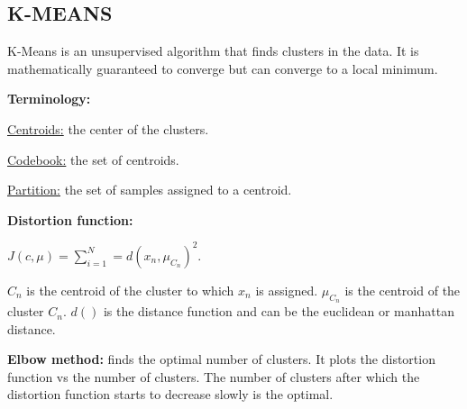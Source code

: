 \subsection*{K-MEANS}
K-Means is an unsupervised algorithm that finds clusters in the data. It is mathematically
guaranteed to converge but can converge to a local minimum.

\textbf{Terminology:}

\underline{Centroids:} the center of the clusters.

\underline{Codebook:} the set of centroids.

\underline{Partition:} the set of samples assigned to a centroid.

\textbf{Distortion function:}

$J(c, \mu)=\sum_{i=1}^{N} = d(x_n, \mu_{C_n})^2$.

$C_n$ is the centroid of the cluster to which $x_n$ is assigned.
$\mu_{C_n}$ is the centroid of the cluster $C_n$. $d()$ is the distance function and can
be the euclidean or manhattan distance.

\textbf{Elbow method:}
finds the optimal number of clusters. It plots the distortion
function vs the number of clusters. The number of clusters after which the distortion function
starts to decrease slowly is the optimal.

